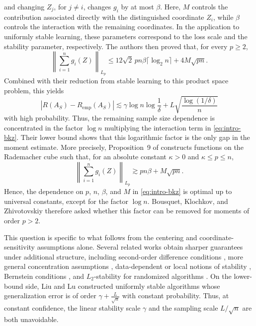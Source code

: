 \documentclass[11pt]{article}
\newcommand{\norm}[1]{\left\lVert #1\right\rVert}
\newcommand{\abs}[1]{\left\lvert #1\right\rvert}
\begin{document}
and changing \(Z_j\), for \(j\neq i\), changes \(g_i\) by at most \(\beta\). Here, \(M\) controls the contribution associated directly with the distinguished coordinate \(Z_i\), while \(\beta\) controls the interaction with the remaining coordinates. In the application to uniformly stable learning, these parameters correspond to the loss scale and the stability parameter, respectively. The authors then proved that, for every \(p\ge2\),
\begin{equation}\label{eq:intro-bkz}
\norm{\sum_{i=1}^n g_i(Z)}_{L_p}
\le
12\sqrt2\,pn\beta\lceil\log_2 n\rceil
+
4M\sqrt{pn}.
\end{equation}
Combined with their reduction from stable learning to this product space problem, this yields
\[
\abs{R(A_S)-R_{\mathrm{emp}}(A_S)}
\lesssim
\gamma\log n\log\frac1\delta
+
L\sqrt{\frac{\log(1/\delta)}{n}}
\]
with high probability. Thus, the remaining sample size dependence is concentrated in the factor \(\log n\) multiplying the interaction term in \eqref{eq:intro-bkz}. Their lower bound shows that this logarithmic factor is the only gap in the moment estimate. More precisely, Proposition~9 of \cite{bkz2020} constructs functions on the Rademacher cube such that, for an absolute constant \(\kappa>0\) and \(\kappa\le p\le n\),
\[
\norm{\sum_{i=1}^n g_i(Z)}_{L_p}
\gtrsim
pn\beta+M\sqrt{pn}.
\]
Hence, the dependence on \(p\), \(n\), \(\beta\), and \(M\) in \eqref{eq:intro-bkz} is optimal up to universal constants, except for the factor \(\log n\). Bousquet, Klochkov, and Zhivotovskiy therefore asked whether this factor can be removed for moments of order \(p>2\).

This question is specific to what follows from the centering and coordinate-sensitivity assumptions alone. Several related works obtain sharper guarantees under additional structure, including second-order difference conditions \cite{maurer2017second}, more general concentration assumptions \cite{kontorovich2014concentration}, data-dependent or local notions of stability \cite{foster2019hypothesis,deng2021locally}, Bernstein conditions \cite{klochkov2021stability}, and \(L_2\)-stability for randomized algorithms \cite{yuan2023l2}. On the lower-bound side, Liu and Lu \cite{liulu2020lower} constructed uniformly stable algorithms whose generalization error is of order
\(
\gamma+\frac{L}{\sqrt n}
\)
with constant probability. Thus, at constant confidence, the linear stability scale \(\gamma\) and the sampling scale \(L/\sqrt n\) are both unavoidable.
\end{document}
